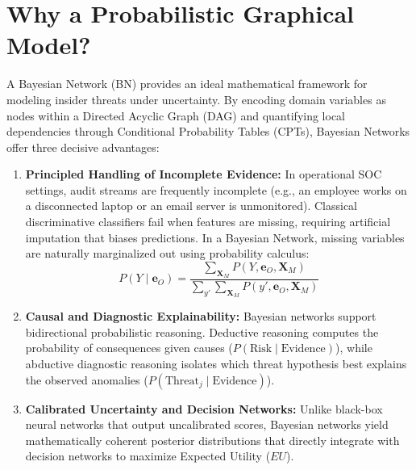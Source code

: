 \documentclass[12pt,a4paper]{report}
\begin{document}
\section{Why a Probabilistic Graphical Model?}
A Bayesian Network (BN) provides an ideal mathematical framework for modeling insider threats under uncertainty. By encoding domain variables as nodes within a Directed Acyclic Graph (DAG) and quantifying local dependencies through Conditional Probability Tables (CPTs), Bayesian Networks offer three decisive advantages:
\begin{enumerate}
    \item \textbf{Principled Handling of Incomplete Evidence:} In operational SOC settings, audit streams are frequently incomplete (e.g., an employee works on a disconnected laptop or an email server is unmonitored). Classical discriminative classifiers fail when features are missing, requiring artificial imputation that biases predictions. In a Bayesian Network, missing variables are naturally marginalized out using probability calculus:
    \begin{equation}
        P(Y \mid \mathbf{e}_O) = \frac{\sum_{\mathbf{X}_M} P(Y, \mathbf{e}_O, \mathbf{X}_M)}{\sum_{y'} \sum_{\mathbf{X}_M} P(y', \mathbf{e}_O, \mathbf{X}_M)}
    \end{equation}
    \item \textbf{Causal and Diagnostic Explainability:} Bayesian networks support bidirectional probabilistic reasoning. Deductive reasoning computes the probability of consequences given causes ($P(\text{Risk} \mid \text{Evidence})$), while abductive diagnostic reasoning isolates which threat hypothesis best explains the observed anomalies ($P(\text{Threat}_j \mid \text{Evidence})$).
    \item \textbf{Calibrated Uncertainty and Decision Networks:} Unlike black-box neural networks that output uncalibrated scores, Bayesian networks yield mathematically coherent posterior distributions that directly integrate with decision networks to maximize Expected Utility ($EU$).
\end{enumerate}
\end{document}
